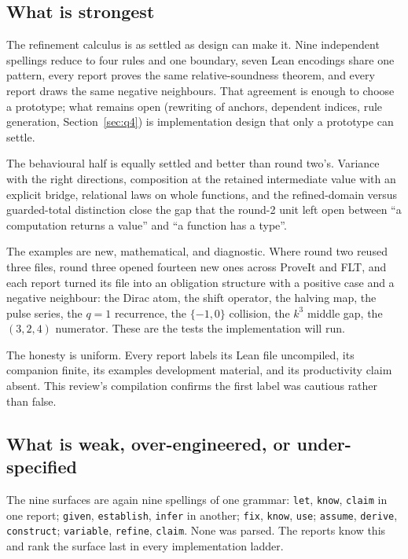 \documentclass[11pt,a4paper]{article}
\newcommand{\code}[1]{\nolinkurl{#1}}
\theoremstyle{definition}
\begin{document}
\subsection{What is strongest}
The refinement calculus is as settled as design can make it. Nine independent spellings reduce to four rules and one boundary, seven Lean encodings share one pattern, every report proves the same relative-soundness theorem, and every report draws the same negative neighbours. That agreement is enough to choose a prototype; what remains open (rewriting of anchors, dependent indices, rule generation, Section~\ref{sec:q4}) is implementation design that only a prototype can settle.

The behavioural half is equally settled and better than round two's. Variance with the right directions, composition at the retained intermediate value with an explicit bridge, relational laws on whole functions, and the refined-domain versus guarded-total distinction close the gap that the round-2 unit left open between ``a computation returns a value'' and ``a function has a type''.

The examples are new, mathematical, and diagnostic. Where round two reused three files, round three opened fourteen new ones across ProveIt and FLT, and each report turned its file into an obligation structure with a positive case and a negative neighbour: the Dirac atom, the shift operator, the halving map, the pulse series, the $q=1$ recurrence, the $\{-1,0\}$ collision, the $k^3$ middle gap, the $(3,2,4)$ numerator. These are the tests the implementation will run.

The honesty is uniform. Every report labels its Lean file uncompiled, its companion finite, its examples development material, and its productivity claim absent. This review's compilation confirms the first label was cautious rather than false.

\subsection{What is weak, over-engineered, or under-specified}
The nine surfaces are again nine spellings of one grammar: \code{let}, \code{know}, \code{claim} in one report; \code{given}, \code{establish}, \code{infer} in another; \code{fix}, \code{know}, \code{use}; \code{assume}, \code{derive}, \code{construct}; \code{variable}, \code{refine}, \code{claim}. None was parsed. The reports know this and rank the surface last in every implementation ladder.
\end{document}

